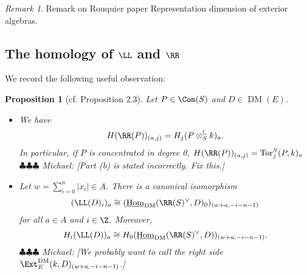 \documentclass[12pt]{amsart}
\newtheorem{prop}[lemma]{Proposition}
\theoremstyle{definition}
\theoremstyle{remark}
\newtheorem{remark}[lemma]{Remark}
\newcommand{\Tor}{\operatorname{Tor}}
\newcommand{\Hom}{\operatorname{Hom}} %
\newcommand{\michael}[1]{{\color{red} \sf $\clubsuit\clubsuit\clubsuit$ Michael: [#1]}}
\def\DM{\operatorname{DM}}
\begin{document}
\begin{remark}
Remark on Rouquier paper Representation dimension of exterior algebras.
\end{remark}

\subsection{The homology of $\LL$ and $\RR$}


We record the following useful observation: 
\begin{prop}[cf. \cite{EFS} Proposition 2.3]
\label{tor} 
Let $P \in \Com(S)$ and $D \in \DM(E)$.
\begin{itemize}
\item[(a)] We have
$$
H(\RR(P))_{(a, j)} = H_{j} (P \otimes^{\mathbb{L}}_S k)_a.
$$
In particular, if $P$ is concentrated in degree 0, $H(\RR(P))_{(a, j)} = \Tor_{j}^S(P, k)_a$
\michael{Part (b) is stated incorrectly. Fix this.}
\item[(b)] Let $w = \sum_{i = 0}^n |x_i| \in A$. There is a canonical isomorphism
$$
(\LL(D)_i)_a \cong (\underline{\Hom}_{\DM}(\RR(S)^\vee, D)_0)_{(w + a, -i - n - 1)}
$$
for all $a \in A$ and $i \in \Z$. Moreover,
$$
H_i(\LL(D))_a \cong H_0(\underline{\Hom}_{\DM}(\RR(S)^\vee, D))_{(w + a, -i - n - 1)}.
$$
\michael{We probably want to call the right side $\Ext_E^{\DM}(k, D)_{(w + a, -i - n - 1)}$.}
\end{itemize}
\end{prop}
\end{document}
